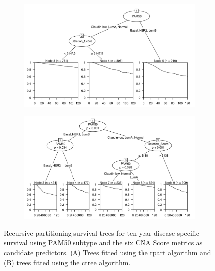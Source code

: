 \begin{figure}[!h]
\centering

\vspace{0.5cm}

\begin{subfigure}{\textwidth}
\subcaption{}
\includegraphics[width=1\textwidth]{../figures/Chapter_3/PartyKit_Survival_Score_TenYearDSS_PAM50.png}
\end{subfigure}

\vspace{2cm}

\begin{subfigure}{\textwidth}
\subcaption{}
\includegraphics[width=1\textwidth]{../figures/Chapter_3/Ctree_Survival_Score_TenYearDSS_PAM50.png}
\end{subfigure}

\vspace{0.5cm}

\caption[Recursive partitioning survival trees for ten-year disease-specific survival using PAM50 subtype and the six CNA Score metrics as candidate predictors.]{Recursive partitioning survival trees for ten-year disease-specific survival using PAM50 subtype and the six CNA Score metrics as candidate predictors. (A) Trees fitted using the rpart algorithm and (B) trees fitted using the ctree algorithm.}
\label{fig:PAM50_CNA_Score_TenYearDSS}
\end{figure}


